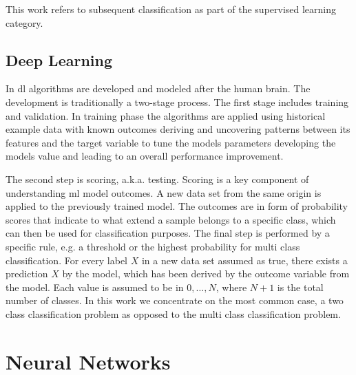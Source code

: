 This work refers to subsequent classification as part of the supervised learning category.

\subsection{Deep Learning}

In \acrshort{dl} algorithms are developed and modeled after the human brain. The development is traditionally a two-stage process. The first stage includes training and validation. In training phase the algorithms are applied using historical example data with known outcomes deriving and uncovering patterns between its features and the target variable to tune the models parameters developing the models value and leading to an overall performance improvement.

The second step is scoring, a.k.a. testing. Scoring is a key component of understanding \acrshort{ml} model outcomes. A new data set from the same origin is applied to the previously trained model. The outcomes are in form of probability scores that indicate to what extend a sample belongs to a specific class, which can then be used for classification purposes. The final step is performed by a specific rule, e.g. a threshold or the highest probability for multi class classification. For every label \( X \) in a new data set assumed as true, there exists a prediction \( X \) by the model, which has been derived by the outcome variable from the model. Each value is assumed to be in \( { 0, \dots , N } \), where \( N + 1 \) is the total number of classes. In this work we concentrate on the most common case, a two class classification problem as opposed to the multi class classification problem.

\section{Neural Networks}

